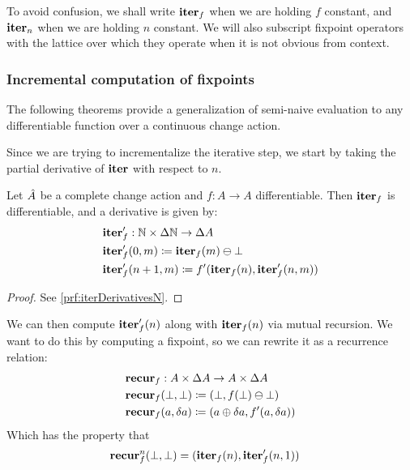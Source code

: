 To avoid confusion, we shall write $\mathbf{iter}_f$ when we are holding $f$ constant,
and $\mathbf{iter}_n$ when we are holding $n$ constant. We will also subscript fixpoint
operators with the lattice over which they operate when it is not obvious from context.

\subsubsection{Incremental computation of fixpoints}

The following theorems provide a
generalization of semi-naive evaluation to any differentiable function over a
continuous change action. 

Since we are trying to incrementalize the iterative step, we start by taking the partial
derivative of $\mathbf{iter}$ with respect to $n$.

\begin{prop}[name=Derivative of the iteration map with respect to $n$, restate=iterDerivativesN]
  \label{prop:iterDerivativesN}
  Let $\hat{A}$ be a complete change action and $f: A \rightarrow A$ differentiable. Then $\mathbf{iter}_f$ is differentiable, and a derivative is given by:
  \begin{align*}
    &\mathbf{iter}_f': \mathbb{N} \times \Delta \mathbb{N} \rightarrow \Delta A\\
    &\mathbf{iter}_f'(0, m) \coloneqq \mathbf{iter}_f(m) \ominus \bot\\
    &\mathbf{iter}_f'(n+1, m) \coloneqq f'(\mathbf{iter}_f(n), \mathbf{iter}_f'(n, m))
  \end{align*}
\end{prop}
\ifproofs
\begin{proof}
  See \cref{prf:iterDerivativesN}.
\end{proof}
\fi

We can then compute $\mathbf{iter}_f'(n)$ along with $\mathbf{iter}_f(n)$ via mutual recursion.
We want to do this by computing a fixpoint, so we can rewrite it as a recurrence
relation:
\begin{align*}
  &\mathbf{recur}_f : A \times \Delta A \rightarrow A \times \Delta A\\
  &\mathbf{recur}_f (\bot, \bot) \coloneqq (\bot, f(\bot) \ominus \bot)\\
  &\mathbf{recur}_f (a, \delta a) \coloneqq (a \oplus \delta a, f'(a, \delta a))
\end{align*}
Which has the property that
\begin{align*}
  &\mathbf{recur}_f^n (\bot, \bot) = (\mathbf{iter}_f(n), \mathbf{iter}_f'(n, 1))
\end{align*}

